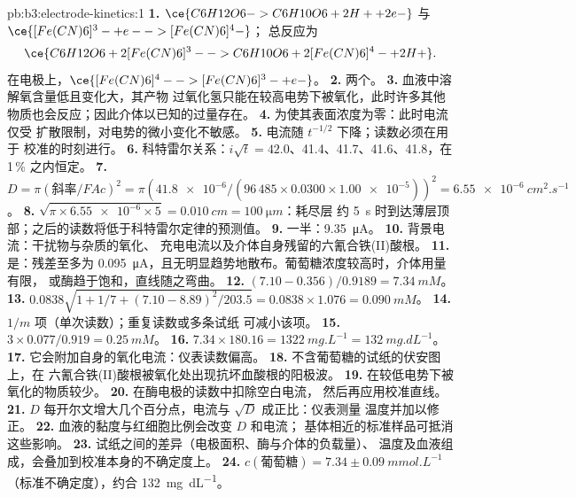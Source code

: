 \begin{solution}{pb:b3:electrode-kinetics:1}
\textbf{1.} $\ce{C6H12O6 -> C6H10O6 + 2 H+ + 2 e-}$ 与 $\ce{[Fe(CN)6]^3- + e- -> [Fe(CN)6]^4-}$；
总反应为
\[
  \ce{C6H12O6 + 2 [Fe(CN)6]^3- -> C6H10O6 + 2 [Fe(CN)6]^4- + 2 H+} .
\]
在电极上，$\ce{[Fe(CN)6]^4- -> [Fe(CN)6]^3- + e-}$。
\textbf{2.} 两个。
\textbf{3.} 血液中溶解氧含量低且变化大，其产物
过氧化氢只能在较高电势下被氧化，此时许多其他
物质也会反应；因此介体以已知的过量存在。
\textbf{4.} 为使其表面浓度为零：此时电流仅受
扩散限制，对电势的微小变化不敏感。
\textbf{5.} 电流随 $t^{-1/2}$ 下降；读数必须在用于
校准的时刻进行。
\textbf{6.} 科特雷尔关系：$i\sqrt t = 42.0$、41.4、41.7、41.6、41.8，在 1\,\% 之内恒定。
\textbf{7.} $D = \pi(\text{斜率}/FAc)^2 = \pi(\num{41.8e-6}/(96\,485 \times 0.0300 \times \num{1.00e-5}))^2 = \qty{6.55e-6}{cm^2.s^{-1}}$。
\textbf{8.} $\sqrt{\pi \times \num{6.55e-6} \times 5} = \qty{0.010}{cm} = \qty{100}{\micro m}$：耗尽层
约 \qty{5}{s} 时到达薄层顶部；之后的读数将低于科特雷尔定律的预测值。
\textbf{9.} 一半：\qty{9.35}{\micro A}。
\textbf{10.} 背景电流：干扰物与杂质的氧化、
充电电流以及介体自身残留的六氰合铁(II)酸根。
\textbf{11.} 是：残差至多为 \qty{0.095}{\micro A}，且无明显趋势地散布。葡萄糖浓度较高时，介体用量有限，
或酶趋于饱和，直线随之弯曲。
\textbf{12.} $(7.10 - 0.356)/0.9189 = \qty{7.34}{mM}$。
\textbf{13.} $0.0838\sqrt{1 + 1/7 + (7.10 - 8.89)^2/203.5} = 0.0838 \times 1.076 = \qty{0.090}{mM}$。
\textbf{14.} $1/m$ 项（单次读数）；重复读数或多条试纸
可减小该项。
\textbf{15.} $3 \times 0.077/0.919 = \qty{0.25}{mM}$。
\textbf{16.} $7.34 \times 180.16 = \qty{1322}{mg.L^{-1}} = \qty{132}{mg.dL^{-1}}$。
\textbf{17.} 它会附加自身的氧化电流：仪表读数偏高。
\textbf{18.} 不含葡萄糖的试纸的伏安图上，在
六氰合铁(II)酸根被氧化处出现抗坏血酸根的阳极波。
\textbf{19.} 在较低电势下被氧化的物质较少。
\textbf{20.} 在酶电极的读数中扣除空白电流，
然后再应用校准直线。
\textbf{21.} $D$ 每开尔文增大几个百分点，电流与 $\sqrt D$ 成正比：仪表测量
温度并加以修正。
\textbf{22.} 血液的黏度与红细胞比例会改变 $D$ 和电流；
基体相近的标准样品可抵消这些影响。
\textbf{23.} 试纸之间的差异（电极面积、酶与介体的负载量）、
温度及血液组成，会叠加到校准本身的不确定度上。
\textbf{24.} \textbf{$c(\text{葡萄糖}) = 7.34 \pm \qty{0.09}{mmol.L^{-1}}$}（标准不确定度），约合 \qty{132}{mg.dL^{-1}}。
\end{solution}
